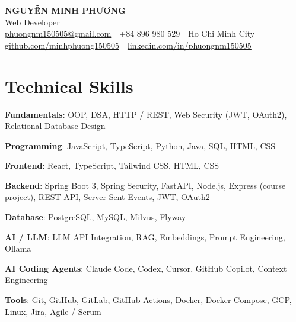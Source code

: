 \documentclass[10pt, a4paper]{article}
\newcommand{\skillrow}[2]{\textbf{#1}: #2\par}
\begin{document}
\color{BodyText}

\begin{center}
  {\fontsize{21pt}{25pt}\selectfont\bfseries\color{NavyBlue} NGUYỄN MINH PHƯƠNG}\\[3pt]
  {\fontsize{12.5pt}{15pt}\selectfont\color{MutedText} Web Developer}\\[4pt]
  {\footnotesize
  \href{mailto:phuongnm150505@gmail.com}{phuongnm150505@gmail.com}
  \,\textbar\, +84 896 980 529
  \,\textbar\, Ho Chi Minh City
  \,\textbar\, \href{https://github.com/minhphuong150505}{github.com/minhphuong150505}
  \,\textbar\, \href{https://www.linkedin.com/in/phuongnm150505/}{linkedin.com/in/phuongnm150505}}
\end{center}
\vspace{-6pt}

\section{Technical Skills}
\skillrow{Fundamentals}{OOP, DSA, HTTP / REST, Web Security (JWT, OAuth2), Relational Database Design}
\skillrow{Programming}{JavaScript, TypeScript, Python, Java, SQL, HTML, CSS}
\skillrow{Frontend}{React, TypeScript, Tailwind CSS, HTML, CSS}
\skillrow{Backend}{Spring Boot 3, Spring Security, FastAPI, Node.js, Express (course project), REST API, Server-Sent Events, JWT, OAuth2}
\skillrow{Database}{PostgreSQL, MySQL, Milvus, Flyway}
\skillrow{AI / LLM}{LLM API Integration, RAG, Embeddings, Prompt Engineering, Ollama}
\skillrow{AI Coding Agents}{Claude Code, Codex, Cursor, GitHub Copilot, Context Engineering}
\skillrow{Tools}{Git, GitHub, GitLab, GitHub Actions, Docker, Docker Compose, GCP, Linux, Jira, Agile / Scrum}

\end{document}
